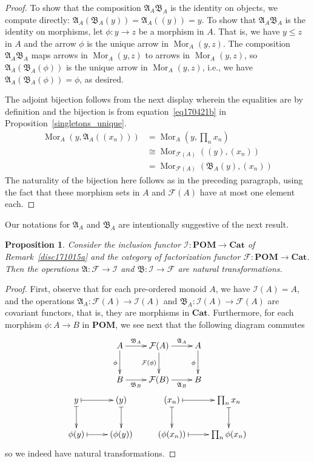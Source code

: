 \documentclass[reqno]{amsart}
\theoremstyle{plain}
\newtheorem{prop}[lem]{Proposition}
\theoremstyle{definition}
\newcommand{\cat}[1]{\mathcal{#1}}
\newcommand{\catf}{\cat{F}}
\renewcommand{\leq}{\leqslant}
\newcommand{\mor}[3]{\operatorname{Mor}_{#1}(#2,#3)}
\newcommand{\catcat}{\mathbf{Cat}}
\newcommand{\catpom}{\mathbf{POM}}
\numberwithin{equation}{lem}
\begin{document}
\begin{proof}
To show that the composition $\mathfrak{A}_A\mathfrak{B}_A$ is the identity on objects, we compute directly:
$\mathfrak{A}_A(\mathfrak{B}_A(y))
=\mathfrak{A}_A((y))=y$. 
To show that $\mathfrak{A}_A\mathfrak{B}_A$ is the identity on morphisms, 
let $\phi\colon y\to z$ be a morphism in $A$.
That is, we have $y\leq z$ in $A$ and the arrow $\phi$ is the unique arrow in $\mor Ayz$.
The composition $\mathfrak{A}_A\mathfrak{B}_A$ maps arrows in $\mor Ayz$ to arrows in $\mor Ayz$,
so $\mathfrak{A}_A(\mathfrak{B}_A(\phi))$ is the unique arrow in $\mor Ayz$,
i.e., we have $\mathfrak{A}_A(\mathfrak{B}_A(\phi))=\phi$, as desired.

The adjoint 
bijection
follows from the next display wherein the equalities
are by definition
and the  
bijection
is from equation~\eqref{eq170421b} in Proposition~\ref{singletons_unique}.\begin{align*}
\mor{A}{y}{\mathfrak A_A((x_n))}
&\textstyle
=
\mor{A}{y}{\prod_nx_n}\\
&
\cong
\mor{\catf(A)}{(y)}{(x_n)}\\
&
=
\mor{\catf(A)}{\mathfrak B_A(y)}{(x_n)}
\end{align*}
The naturality of the bijection here follows as in the preceding paragraph, using the fact that these morphism
sets in $A$ and $\catf(A)$ have at most one element each.
\end{proof}

Our notations for $\mathfrak A_A$ and $\mathfrak B_A$  are intentionally suggestive of the next result.


\begin{prop}\label{prop170430c}
Consider the inclusion functor $\mathcal I\colon\catpom\to\catcat$ 
of
Remark~\ref{disc171015a}
and the category of factorization functor $\catf\colon\catpom\to\catcat$.
Then the operations $\mathfrak A\colon\catf\to\mathcal I$ and $\mathfrak B\colon\mathcal I\to\catf$ are 
natural transformations. 
\end{prop}

\begin{proof}
First, observe that for each pre-ordered monoid $A$, we have $\mathcal I(A)=A$, and the operations
$\mathfrak{A}_A\colon\mathcal{F}(A) \to \mathcal I(A)$ and
$\mathfrak{B}_A\colon \mathcal I(A)\to\mathcal{F}(A)$ are covariant functors, that is, they are morphisms in $\catcat$.
Furthermore, for each morphism $\phi\colon A\to B$ in $\catpom$, we see next that
the following diagram commutes
\begin{gather*}
\xymatrix{
A\ar[r]^-{\mathfrak B_A}
\ar[d]_{\phi}
&\catf(A)
\ar[r]^-{\mathfrak A_A}
\ar[d]_{\catf(\phi)}
&A
\ar[d]_{\phi}
\\
B\ar[r]_-{\mathfrak B_B}
&\catf(B)
\ar[r]_-{\mathfrak A_B}
&B
}\\
\xymatrix{
y\ar@{|->}[r]\ar@{|->}[d]
&(y)\ar@{|->}[d]
&(x_n)\ar@{|->}[r]\ar@{|->}[d]
&\textstyle\prod_{n}x_n\ar@{|->}[d]
\\
\phi(y)\ar@{|->}[r]
&(\phi(y))
&(\phi(x_n))\ar@{|->}[r]
&\textstyle\prod_{n}\phi(x_n)
}
\end{gather*}
so we indeed have natural transformations.
\end{proof}
\end{document}
